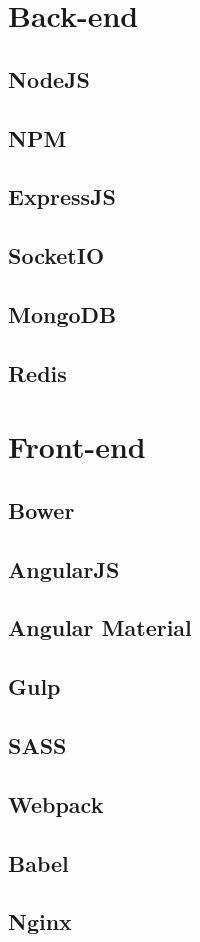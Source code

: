 \section{Back-end}
\subsection{NodeJS}


\subsection{NPM}


\subsection{ExpressJS}


\subsection{SocketIO}


\subsection{MongoDB}


\subsection{Redis}


\section{Front-end}

\subsection{Bower}


\subsection{AngularJS}


\subsection{Angular Material}


\subsection{Gulp}


\subsection{SASS}


\subsection{Webpack}


\subsection{Babel}


\subsection{Nginx}